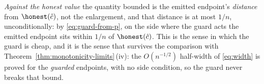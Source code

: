 \begin{remark}
\emph{Against the honest value} the quantity bounded is the emitted
endpoint's \emph{distance} from $\honest(\hat c)$, not the enlargement, and
that distance is at most $1/n$, unconditionally: by \eqref{eq:guard-from-p},
on the side where the guard acts the emitted endpoint sits within $1/n$ of
$\honest(\hat c)$. This is the sense in which the guard is cheap, and it is
the sense that survives the comparison with Theorem~\ref{thm:monotonicity-limits}\,(iv): the
$O(n^{-1/2})$ half-width of \eqref{eq:width} is proved for the
\emph{guarded} endpoints, with no side condition, so the guard never breaks
that bound.
\end{remark}
